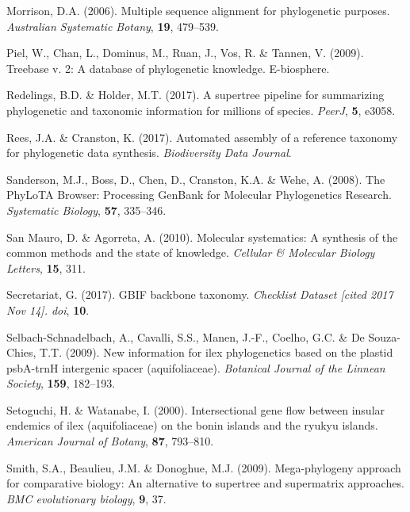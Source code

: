 \documentclass[]{article}
\begin{document}
\leavevmode\hypertarget{ref-morrison2006multiple}{}%
Morrison, D.A. (2006). Multiple sequence alignment for phylogenetic purposes. \emph{Australian Systematic Botany}, \textbf{19}, 479--539.

\leavevmode\hypertarget{ref-piel2009treebase}{}%
Piel, W., Chan, L., Dominus, M., Ruan, J., Vos, R. \& Tannen, V. (2009). Treebase v. 2: A database of phylogenetic knowledge. E-biosphere.

\leavevmode\hypertarget{ref-redelings2017supertree}{}%
Redelings, B.D. \& Holder, M.T. (2017). A supertree pipeline for summarizing phylogenetic and taxonomic information for millions of species. \emph{PeerJ}, \textbf{5}, e3058.

\leavevmode\hypertarget{ref-rees2017automated}{}%
Rees, J.A. \& Cranston, K. (2017). Automated assembly of a reference taxonomy for phylogenetic data synthesis. \emph{Biodiversity Data Journal}.

\leavevmode\hypertarget{ref-sanderson2008phylota}{}%
Sanderson, M.J., Boss, D., Chen, D., Cranston, K.A. \& Wehe, A. (2008). The PhyLoTA Browser: Processing GenBank for Molecular Phylogenetics Research. \emph{Systematic Biology}, \textbf{57}, 335--346.

\leavevmode\hypertarget{ref-san2010molecular}{}%
San Mauro, D. \& Agorreta, A. (2010). Molecular systematics: A synthesis of the common methods and the state of knowledge. \emph{Cellular \& Molecular Biology Letters}, \textbf{15}, 311.

\leavevmode\hypertarget{ref-secretariat2017gbif}{}%
Secretariat, G. (2017). GBIF backbone taxonomy. \emph{Checklist Dataset {[}cited 2017 Nov 14{]}. doi}, \textbf{10}.

\leavevmode\hypertarget{ref-selbach2009new}{}%
Selbach-Schnadelbach, A., Cavalli, S.S., Manen, J.-F., Coelho, G.C. \& De Souza-Chies, T.T. (2009). New information for ilex phylogenetics based on the plastid psbA-trnH intergenic spacer (aquifoliaceae). \emph{Botanical Journal of the Linnean Society}, \textbf{159}, 182--193.

\leavevmode\hypertarget{ref-setoguchi2000intersectional}{}%
Setoguchi, H. \& Watanabe, I. (2000). Intersectional gene flow between insular endemics of ilex (aquifoliaceae) on the bonin islands and the ryukyu islands. \emph{American Journal of Botany}, \textbf{87}, 793--810.

\leavevmode\hypertarget{ref-smith2009mega}{}%
Smith, S.A., Beaulieu, J.M. \& Donoghue, M.J. (2009). Mega-phylogeny approach for comparative biology: An alternative to supertree and supermatrix approaches. \emph{BMC evolutionary biology}, \textbf{9}, 37.
\end{document}
